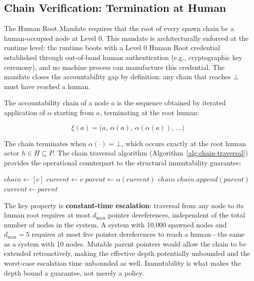 \subsection{Chain Verification: Termination at Human}
\label{sec:rsp-chain-verification}

The Human Root Mandate requires that the root of every spawn chain be a human-occupied node at Level 0. This mandate is architecturally enforced at the runtime level: the runtime boots with a Level 0 Human Root credential established through out-of-band human authentication (e.g., cryptographic key ceremony), and no machine process can manufacture this credential. The mandate closes the accountability gap by definition: any chain that reaches $\bot$ must have reached a human.

The accountability chain of a node $a$ is the sequence obtained by iterated application of $\alpha$ starting from $a$, terminating at the root human:

\begin{equation}
\xi(a) = \bigl( a,\ \alpha(a),\ \alpha(\alpha(a)),\ \ldots \bigr)
\end{equation}

The chain terminates when $\alpha(\cdot) = \bot$, which occurs exactly at the root human actor $h \in H \subseteq P$. The chain traversal algorithm (Algorithm~\ref{alg:chain-traversal}) provides the operational counterpart to the structural immutability guarantee:

\begin{algorithm}
\caption{Chain Traversal}\label{alg:chain-traversal}
\begin{algorithmic}
    \State $chain \gets [c]$
    \State $current \gets c$
    \Loop
        \State $parent \gets \alpha(current)$
            \State \Return $chain$ 
        \EndIf
        \State $chain.append(parent)$
        \State $current \gets parent$
    \EndLoop
\EndProcedure
\end{algorithmic}
\end{algorithm}

The key property is \textbf{constant-time escalation}: traversal from any node to its human root requires at most $d_{\max}$ pointer dereferences, independent of the total number of nodes in the system. A system with 10,000 spawned nodes and $d_{\max} = 5$ requires at most five pointer dereferences to reach a human---the same as a system with 10 nodes. Mutable parent pointers would allow the chain to be extended retroactively, making the effective depth potentially unbounded and the worst-case escalation time unbounded as well. Immutability is what makes the depth bound a guarantee, not merely a policy.


